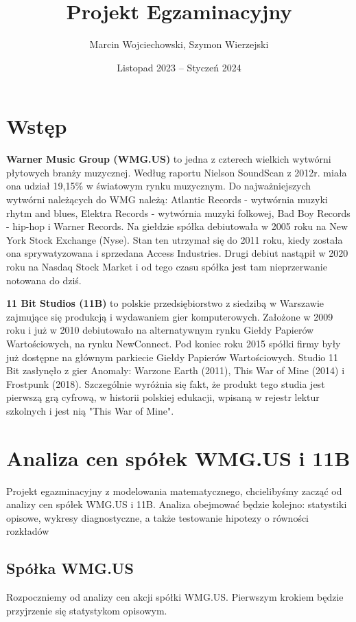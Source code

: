 \documentclass[a4paper,11pt]{article}
\title{Projekt Egzaminacyjny}
\author{Marcin Wojciechowski, Szymon Wierzejski}
\date{Listopad 2023 -- Styczeń 2024}
\begin{document}
\maketitle
\newpage

\tableofcontents
\newpage

\vspace*{4cm}
\section{Wstęp}
\textbf{Warner Music Group (WMG.US)} to jedna z czterech wielkich wytwórni płytowych branży muzycznej. Według raportu Nielson SoundScan z 2012r. miała ona udział 19,15\% w światowym rynku muzycznym. Do najważniejszych wytwórni należących do WMG należą: Atlantic Records - wytwórnia muzyki rhytm and blues, Elektra Records - wytwórnia muzyki folkowej, Bad Boy Records - hip-hop i Warner Records. Na giełdzie spółka debiutowała w 2005 roku na New York Stock Exchange (Nyse). Stan ten utrzymał się do 2011 roku, kiedy została ona sprywatyzowana i sprzedana Access Industries. Drugi debiut nastąpił w 2020 roku na Nasdaq Stock Market i od tego czasu spółka jest tam nieprzerwanie notowana do dziś.

\smallskip

\textbf{11 Bit Studios (11B)} to polskie przedsiębiorstwo z siedzibą w Warszawie zajmujące się produkcją i wydawaniem gier komputerowych. Założone w 2009 roku i już w 2010 debiutowało na alternatywnym rynku Giełdy Papierów Wartościowych, na rynku NewConnect. Pod koniec roku 2015 spółki firmy były już dostępne na głównym parkiecie Giełdy Papierów Wartościowych. Studio 11 Bit zasłynęło z gier Anomaly: Warzone Earth (2011), This War of Mine (2014) i Frostpunk (2018). Szczególnie wyróżnia się fakt, że produkt tego studia jest pierwszą grą cyfrową, w historii polskiej edukacji, wpisaną w rejestr lektur szkolnych i jest nią "This War of Mine".

\newpage
\section {Analiza cen spółek WMG.US i 11B}
Projekt egazminacyjny z modelowania matematycznego, chcielibyśmy zacząć od analizy cen spółek WMG.US i 11B. Analiza obejmować będzie kolejno: statystiki opisowe, wykresy diagnostyczne, a także testowanie hipotezy o równości rozkładów

\smallskip

\subsection{Spółka WMG.US}
Rozpoczniemy od analizy cen akcji spółki WMG.US. Pierwszym krokiem będzie przyjrzenie się statystykom opisowym.
\end{document}
